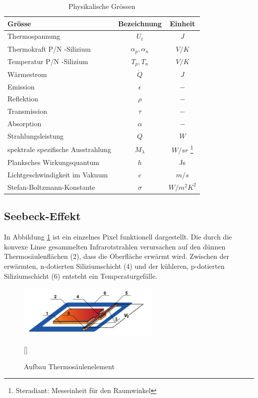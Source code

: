 \begin{table}[H]
	\centering
	\begin{tabular}{l|c|c}
		\rowcolor{gray} Grösse &  Bezeichnung  & Einheit \\
		\hline 
		Thermospannung &  $ U_{t}$ & $J$  \\ 
		\rowcolor{gray} Thermokraft P/N -Silizium  & $\alpha_{p},\alpha_{n}$ & $V/K$\\	
		Temperatur P/N -Silizium &  $T_{p},T_{n}$ & $V/K$ \\
		\rowcolor{gray}Wärmestrom &  $\dot{Q}$ & $J$  \\ 
		Emission & $\epsilon$ & $-$\\	
		\rowcolor{gray}Reflektion &  $\rho $ & $-$ \\
		Transmission & $\tau$ & $-$\\
		\rowcolor{gray}Absorption &  $\alpha$ & $-$  \\ 
		Strahlungsleistung & $\dot{Q}$ & $W$\\
		\rowcolor{gray}spektrale spezifische Ausstrahlung &  $M_{\lambda }$ & $W/sr$ \footnote[2]{Steradiant: Messeinheit für den Raumwinkel} \\
		Planksches Wirkungsquantum &  $ h$ & Js \\ 
		\rowcolor{gray} Lichtgeschwindigkeit im Vakuum & $c $ & $ m/s$ \\ 
 		Stefan-Boltzmann-Konstante & $\sigma$ & $ W/m^2K^2 $ \\ 
	\end{tabular}
	\caption{Physikalische Grössen}
	\label{tab:Legende Physikalische Grössen} 
\end{table} 


\subsection{Seebeck-Effekt}
\label{subsec:seebeck}
In Abbildung \ref{fig:AufbauThermo} ist ein einzelnes Pixel funktionell dargestellt. Die durch die konvexe Linse gesammelten Infrarotstrahlen verursachen auf den dünnen Thermosäulenflächen (2), dass die Oberfläche erwärmt wird. Zwischen der erwärmten, n-dotierten Siliziumschicht (4) und der kühleren, p-dotierten Siliziumschicht (6) entsteht ein Temperaturgefälle.   

\begin{figure}[H]
	\centering
	\includegraphics[width=0.6\textwidth]
	{fig/Mems_Thermopile.PNG}
	\caption[Aufbau Thermosäulenelement]{Aufbau Thermosäulenelement} [\protect\cite{AMG8834}]
	\label{fig:AufbauThermo}
\end{figure}

